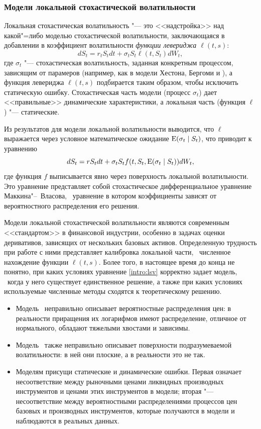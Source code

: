 \subsubsection{Модели локальной стохастической волатильности}

Локальная стохастическая волатильность "--- это <<надстройка>> над какой"=либо моделью стохастической волатильности, заключающаяся в добавлении в коэффициент волатильности\emph{ функции левериджа $\ell(t,s)$}:
\[
d S_t = r_tS_t dt + \sigma_tS_t\ell(t,S_t) dW_t,
\]
где $\sigma_t$ "--- стохастическая волатильность, заданная конкретным процессом, зависящим от парамеров (например, как в модели Хестона, Бергоми и \tp), а функция левериджа $\ell(t,s)$ подбирается таким образом, чтобы исключить статическую ошибку.
Стохастическая часть модели (процесс $\sigma_t$) дает <<правильные>> динамические характеристики, а локальная часть (функция $\ell$) "--- статические.

Из результатов для модели локальной волатильности выводится, что $\ell$ выражается через условное математическое ожидание $\operatorname{E}(\sigma_t\mid S_t)$, что приводит к уравнению
\begin{equation}
\label{intro:lsv}
dS_t = rS_t dt + \sigma_t S_t f(t,S_t,\operatorname{E}(\sigma_t\mid S_t)) d W_t,
\end{equation}
где функция $f$ выписывается явно через поверхность локальной волатильности.
Это уравнение представляет собой стохастическое дифференциальное уравнение Маккина"--~Власова, \te\ уравнение в котором коэффициенты зависят от вероятностного распределения его решения.

Модели локальной стохастической волатильности являются современным <<стандартом>> в финансовой индустрии, особенно в задачах оценки деривативов, зависящих от нескольких базовых активов. 
Определенную трудность при работе с ними представляет калибровка локальной части, \te\ численное нахождение функции $\ell(t,s)$.
Более того, в настоящее время до конца не понятно, при каких условиях уравнение \eqref{intro:lsv} корректно задает модель, \te\ когда у него существует единственное решение, а также при каких условиях используемые численные методы сходятся к теоретическому решению. 


\summary
\begin{itemize}
\item Модель \bs\ неправильно описывает вероятностные распределения цен: в реальности приращения их логарифмов имеют распределение, отличное от нормального, обладают тяжелыми хвостами и зависимы.
\item Модель \bs\ также неправильно описывает поверхности подразумеваемой волатильности: в ней они плоские, а в реальности это не так.
\item Моделям присущи статические и динамические ошибки.
Первая означает несоответствие между рыночными ценами ликвидных производных инструментов и ценами этих инструментов в модели; вторая "--- несоответствие между вероятностными распределениями процессов цен базовых и производных инструментов, которые получаются в модели и наблюдаются в реальных данных. 
\end{itemize}

